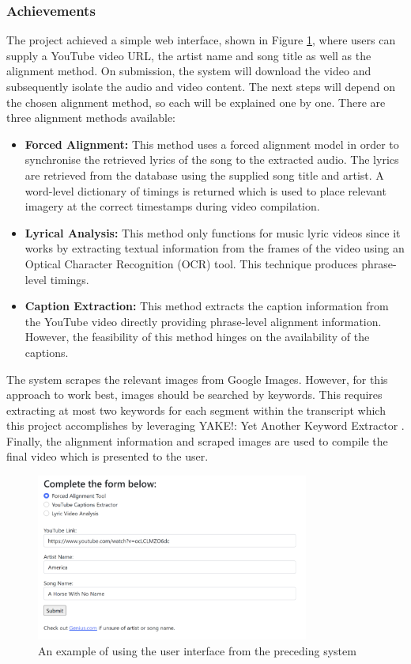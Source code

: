 \documentclass{l4proj}
\begin{document}
\subsubsection{Achievements}
The project achieved a simple web interface, shown in Figure \ref{fig:parker_interface}, where users can supply a YouTube video URL, the artist name and song title as well as the alignment method. On submission, the system will download the video and subsequently isolate the audio and video content. The next steps will depend on the chosen alignment method, so each will be explained one by one. There are three alignment methods available:
\begin{itemize}
    \item \textbf{Forced Alignment:} This method uses a forced alignment model in order to synchronise the retrieved lyrics of the song to the extracted audio. The lyrics are retrieved from the \cite{genius} database using the supplied song title and artist. A word-level dictionary of timings is returned which is used to place relevant imagery at the correct timestamps during video compilation.

    \item \textbf{Lyrical Analysis:} This method only functions for music lyric videos since it works by extracting textual information from the frames of the video using an Optical Character Recognition (OCR) tool. This technique produces phrase-level timings.

    \item \textbf{Caption Extraction:} This method extracts the caption information from the YouTube video directly providing phrase-level alignment information. However, the feasibility of this method hinges on the availability of the captions.
\end{itemize}

The system scrapes the relevant images from Google Images. However, for this approach to work best, images should be searched by keywords. This requires extracting at most two keywords for each segment within the transcript which this project accomplishes by leveraging YAKE!: Yet Another Keyword Extractor \citep{campos2020yake}. Finally, the alignment information and scraped images are used to compile the final video which is presented to the user.

\begin{figure}
    \centering
    \includegraphics[width=0.8\textwidth]{figures/parker_interface.pdf}
    \caption{An example of using the user interface from the preceding system}
    \label{fig:parker_interface}
\end{figure}
\end{document}
